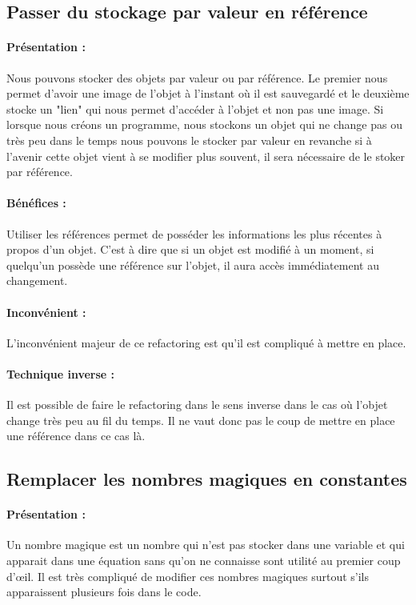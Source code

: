 \documentclass[a4paper,twoside,12pt,openright]{report}
\begin{document}
\subsection{Passer du stockage par valeur en référence}
\paragraph{Présentation :}
Nous pouvons stocker des objets par valeur ou par référence. Le premier nous permet d'avoir une image de l'objet à l'instant où il est sauvegardé et le deuxième stocke un "lien" qui nous permet d'accéder à l'objet et non pas une image.
Si lorsque nous créons un programme, nous stockons un objet qui ne change pas ou très peu dans le temps nous pouvons le stocker par valeur en revanche si à l'avenir cette objet vient à se modifier plus souvent, il sera nécessaire de le stoker par référence.

\paragraph{Bénéfices :}
Utiliser les références permet de posséder les informations les plus récentes à propos d'un objet. C'est à dire que si un objet est modifié à un moment, si quelqu'un possède une référence sur l'objet, il aura accès immédiatement au changement.

\paragraph{Inconvénient :}
L'inconvénient majeur de ce refactoring est qu'il est compliqué à mettre en place.

\paragraph{Technique inverse :}
Il est possible de faire le refactoring dans le sens inverse dans le cas où l'objet change très peu au fil du temps. Il ne vaut donc pas le coup de mettre en place une référence dans ce cas là.\\


\subsection{Remplacer les nombres magiques en constantes}
\paragraph{Présentation :}
Un nombre magique est un nombre qui n'est pas stocker dans une variable et qui apparait dans une équation sans qu'on ne connaisse sont utilité au premier coup d'œil. Il est très compliqué de modifier ces nombres magiques surtout s'ils apparaissent plusieurs fois dans le code.
\end{document}
